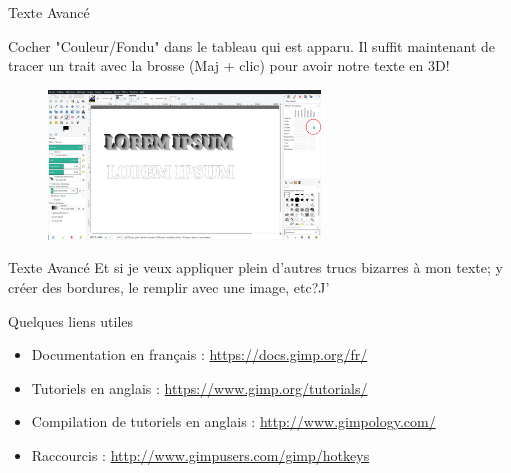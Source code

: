 \documentclass[10pt,svgnames,usenames,table]{beamer}
\begin{document}
\begin{frame}{Texte Avancé}
\begin{enumerate}
{			Cocher "Couleur/Fondu" dans le tableau qui est apparu. Il suffit maintenant de tracer un trait avec la brosse (Maj + clic) pour avoir notre texte en 3D!			
			\begin{figure}
			\centering
			\includegraphics[height=150px]{Images/text/3D4}
			\end{figure}
		}		
		\end{enumerate}
\end{frame}

\begin{frame}{Texte Avancé}
	Et si je veux appliquer plein d'autres trucs bizarres à mon texte; y créer des bordures, le remplir avec une image, etc?J'
\end{frame}






\appendix 


\begin{frame}{Quelques liens utiles}
	\begin{itemize}
		\item Documentation en français : \url{https://docs.gimp.org/fr/}
		\item Tutoriels en anglais : \url{https://www.gimp.org/tutorials/}
		\item Compilation de tutoriels en anglais : \url{http://www.gimpology.com/}
		\item Raccourcis : \url{http://www.gimpusers.com/gimp/hotkeys}
	\end{itemize}
\end{frame}
\end{document}
